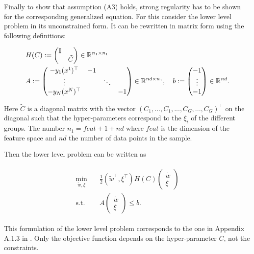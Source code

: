 Finally to show that assumption (A3) holds, strong regularity has to be shown for the corresponding generalized equation.
For this consider the lower level problem in its unconstrained form.
It can be rewritten in matrix form using the following definitions:

\begin{equation*}
\begin{split}
	&H(C):= \begin{pmatrix} \mathbb{I} \\ & \tilde{C}\end{pmatrix}\in \mathbb{R}^{n_1\times n_1} \\
	&A := \begin{pmatrix}	-y_1(x^1)^{\top} & -1 \\
		\vdots & & \ddots \\ -y_N(x^N)^{\top} & & & -1\end{pmatrix} \in \mathbb{R}^{nd \times n_1}, \quad  b:= \begin{pmatrix}-1\\\vdots\\-1\end{pmatrix} \in \mathbb{R}^{nd}.
\end{split}
\end{equation*}

Here \(\tilde{C}\) is a diagonal matrix with the vector \((C_1,...,C_1,...,C_G,...,C_G)^{\top}\) on the diagonal such that the hyper-parameters correspond to the \(\xi_i\) of the different groups. The number \(n_1 = feat+1+nd\) where \(feat\) is the dimension of the feature space and \(nd\) the number of data points in the sample.

Then the lower level problem can be written as

\begin{align}
\begin{split}
	\min_{\tilde{w},\xi} & \quad \frac{1}{2} (\tilde{w}^{\top},\xi^{\top}) H(C) \begin{pmatrix}\tilde{w}\\\xi\end{pmatrix} \\
	\text{s.t.} & \quad A \begin{pmatrix}\tilde{w}\\\xi\end{pmatrix} \leq b.
\end{split}
\label{low_QP}
\end{align}

This formulation of the lower level problem corresponds to the one in Appendix A.1.3 in \cite{Outrata1998}. Only the objective function depends on the hyper-parameter \(C\), not the constraints.

